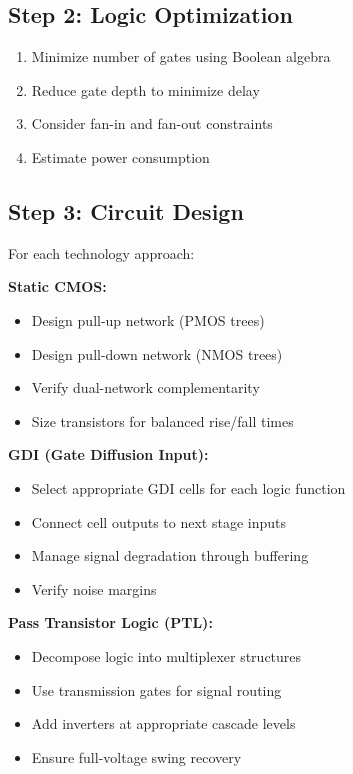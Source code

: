 \documentclass[12pt,a4paper,twoside]{report}
\begin{document}
\begin{appendices}
\subsection{Step 2: Logic Optimization}

\begin{enumerate}
    \item Minimize number of gates using Boolean algebra
    \item Reduce gate depth to minimize delay
    \item Consider fan-in and fan-out constraints
    \item Estimate power consumption
\end{enumerate}

\subsection{Step 3: Circuit Design}

For each technology approach:

\textbf{Static CMOS:}
\begin{itemize}
    \item Design pull-up network (PMOS trees)
    \item Design pull-down network (NMOS trees)
    \item Verify dual-network complementarity
    \item Size transistors for balanced rise/fall times
\end{itemize}

\textbf{GDI (Gate Diffusion Input):}
\begin{itemize}
    \item Select appropriate GDI cells for each logic function
    \item Connect cell outputs to next stage inputs
    \item Manage signal degradation through buffering
    \item Verify noise margins
\end{itemize}

\textbf{Pass Transistor Logic (PTL):}
\begin{itemize}
    \item Decompose logic into multiplexer structures
    \item Use transmission gates for signal routing
    \item Add inverters at appropriate cascade levels
    \item Ensure full-voltage swing recovery
\end{itemize}


\end{appendices}
\end{document}
